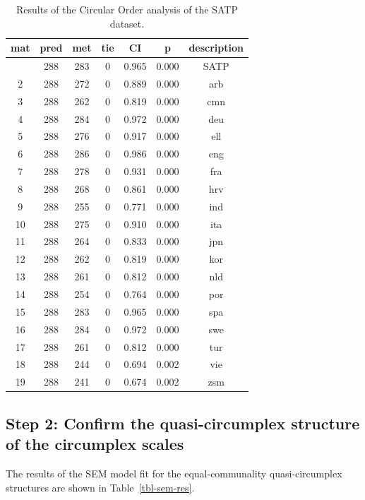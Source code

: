 \documentclass[
  authoryear,
  preprint,
  3p]{elsarticle}
\begin{document}
\begin{longtable}[]{@{}ccccccc@{}}

\caption{\label{tbl-circular-order}Results of the Circular Order
analysis of the SATP dataset.}

\tabularnewline

\toprule\noalign{}
mat & pred & met & tie & CI & p & description \\
\midrule\noalign{}
\endhead
\bottomrule\noalign{}
\endlastfoot
1 & 288 & 283 & 0 & 0.965 & 0.000 & SATP \\
2 & 288 & 272 & 0 & 0.889 & 0.000 & arb \\
3 & 288 & 262 & 0 & 0.819 & 0.000 & cmn \\
4 & 288 & 284 & 0 & 0.972 & 0.000 & deu \\
5 & 288 & 276 & 0 & 0.917 & 0.000 & ell \\
6 & 288 & 286 & 0 & 0.986 & 0.000 & eng \\
7 & 288 & 278 & 0 & 0.931 & 0.000 & fra \\
8 & 288 & 268 & 0 & 0.861 & 0.000 & hrv \\
9 & 288 & 255 & 0 & 0.771 & 0.000 & ind \\
10 & 288 & 275 & 0 & 0.910 & 0.000 & ita \\
11 & 288 & 264 & 0 & 0.833 & 0.000 & jpn \\
12 & 288 & 262 & 0 & 0.819 & 0.000 & kor \\
13 & 288 & 261 & 0 & 0.812 & 0.000 & nld \\
14 & 288 & 254 & 0 & 0.764 & 0.000 & por \\
15 & 288 & 283 & 0 & 0.965 & 0.000 & spa \\
16 & 288 & 284 & 0 & 0.972 & 0.000 & swe \\
17 & 288 & 261 & 0 & 0.812 & 0.000 & tur \\
18 & 288 & 244 & 0 & 0.694 & 0.002 & vie \\
19 & 288 & 241 & 0 & 0.674 & 0.002 & zsm \\

\end{longtable}

\subsection{Step 2: Confirm the quasi-circumplex structure of the
circumplex
scales}\label{step-2-confirm-the-quasi-circumplex-structure-of-the-circumplex-scales-1}

The results of the SEM model fit for the equal-communality
quasi-circumplex structures are shown in Table~\ref{tbl-sem-res}.
\end{document}
